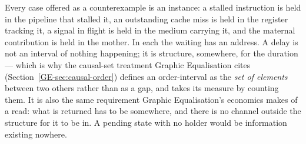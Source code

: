 \documentclass[11pt,a4paper]{article}
\theoremstyle{remark}
\begin{document}
Every case offered as a counterexample is an instance: a stalled instruction is held in the pipeline
that stalled it, an outstanding cache miss is held in the register tracking it, a signal in flight is
held in the medium carrying it, and the maternal contribution is held in the mother. In each the
waiting has an address. A delay is not an interval of nothing happening; it is structure, somewhere,
for the duration --- which is why the causal-set treatment Graphic Equalisation cites
(Section~\ref{GE-sec:causal-order}) defines an order-interval as the \emph{set of elements} between
two others rather than as a gap, and takes its measure by counting them. It is also the same
requirement Graphic Equalisation's economics makes of a read: what is returned has to be somewhere,
and there is no channel outside the structure for it to be in. A pending state with no holder would
be information existing nowhere.
\end{document}
